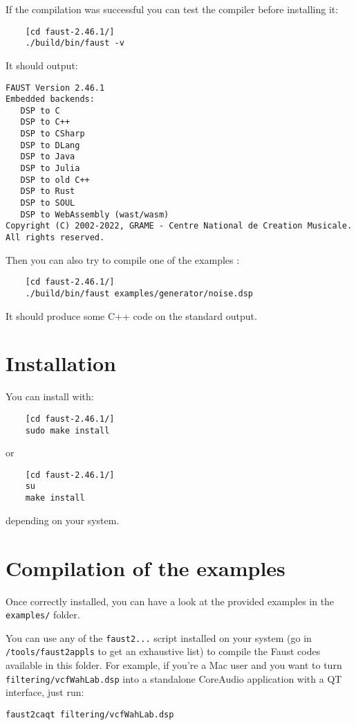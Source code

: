 If the compilation was successful you can test the compiler before installing it:
\begin{lstlisting}
	[cd faust-2.46.1/]
	./build/bin/faust -v
\end{lstlisting}
It should output:
\begin{lstlisting}
FAUST Version 2.46.1
Embedded backends: 
   DSP to C
   DSP to C++
   DSP to CSharp
   DSP to DLang
   DSP to Java
   DSP to Julia
   DSP to old C++
   DSP to Rust
   DSP to SOUL
   DSP to WebAssembly (wast/wasm)
Copyright (C) 2002-2022, GRAME - Centre National de Creation Musicale. All rights reserved. 
\end{lstlisting}

Then you can also try to compile one of the examples :
\begin{lstlisting}
	[cd faust-2.46.1/]
	./build/bin/faust examples/generator/noise.dsp
\end{lstlisting}
It should produce some C++ code on the standard output.

\section{Installation}
You can install \faust with:
\begin{lstlisting}
	[cd faust-2.46.1/]
	sudo make install
\end{lstlisting}
or
\begin{lstlisting}
	[cd faust-2.46.1/]
	su
	make install
\end{lstlisting}
depending on your system.

\section{Compilation of the examples}

Once \faust correctly installed, you can have a look at the provided examples in the \lstinline'examples/' folder. 

You can use any of the \lstinline'faust2...' script installed on your system (go in \lstinline'/tools/faust2appls' to get an exhaustive list) to compile the Faust codes available in this folder. For example, if you're a Mac user and you want to turn \lstinline'filtering/vcfWahLab.dsp' into a standalone CoreAudio application with a QT interface, just run:

\lstinline'faust2caqt filtering/vcfWahLab.dsp'

